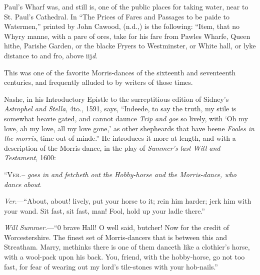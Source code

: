 Paul’s Wharf was, and still is, one of the public places for taking water, near
to St. Paul’s Cathedral. In “The Prices of Fares and Passages to be paide to
Watermen,” printed by John Cawood, (n.d.,) is the following: “Item, that no
Whyry manne, with a pare of ores, take for his fare from Pawles Wharfe, Queen
hithe, Parishe Garden, or the blacke Fryers to Westminster, or White hall, or
lyke distance to and fro, above iij\textit{d}.




This was one of the favorite Morris-dances of the sixteenth and seventeenth
centuries, and frequently alluded to by writers of those times.

Nashe, in his Introductory Epistle to the surreptitious edition of Sidney’s
\textit{Astrophel and Stella}, 4to., 1591, says, “Indeede, to say the truth, my stile is
somewhat heavie gated, and cannot daunce \textit{Trip and goe} so lively, with ‘Oh my
love, ah my love, all my love gone,’ as other shepheards that have beene \textit{Fooles in
the morris}, time out of minde.” He introduces it more at length, and with a
description of the Morris-dance, in the play of \textit{Summer’s last Will and Testament},
1600:

\begin{scverse}
“\textsc{Ver}.-- \textit{goes in and fetcheth out the Hobby-horse and the Morris-dance, who
dance about}.
\end{scverse}

\textit{Ver}.—“About, about! lively, put your horse to it; rein him harder; jerk him with
your wand. Sit fast, sit fast, man! Fool, hold up your ladle
 there.”

\textit{Will Summer}.—“0 brave Hall!
 O well said, butcher! Now for the credit of
Worcestershire. The finest set of Morris-dancers that is between this and Streatham. 
Marry, methinks there is one of them danceth \pagebreak like a clothier’s horse, with a wool-pack
upon his back. You, friend, with the hobby-horse, go not too fast, for fear of wearing
out my lord’s tile-stones with your hob-nails.”

